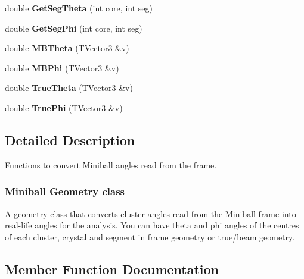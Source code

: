 \begin{DoxyCompactItemize}
double {\bfseries Get\+Seg\+Theta} (int core, int seg)
\item 
\mbox{\label{class_m_b_geometry_a575ddd6022d2d686a83ebce3195b6c50}} 
double {\bfseries Get\+Seg\+Phi} (int core, int seg)
\item 
\mbox{\label{class_m_b_geometry_af4adfb858000405b21f79a6bf10c3c37}} 
double {\bfseries M\+B\+Theta} (T\+Vector3 \&v)
\item 
\mbox{\label{class_m_b_geometry_a399568d67bb83801ef6a2dbe963a535e}} 
double {\bfseries M\+B\+Phi} (T\+Vector3 \&v)
\item 
\mbox{\label{class_m_b_geometry_afd393f9db7182de7fb19f0c934edb383}} 
double {\bfseries True\+Theta} (T\+Vector3 \&v)
\item 
\mbox{\label{class_m_b_geometry_a718d9c7fcc4a5fb8b9ecaabdc7a0503f}} 
double {\bfseries True\+Phi} (T\+Vector3 \&v)
\end{DoxyCompactItemize}


\subsection{Detailed Description}
Functions to convert Miniball angles read from the frame. 



 \subsubsection*{Miniball Geometry class }

A geometry class that converts cluster angles read from the Miniball frame into real-\/life angles for the analysis. You can have theta and phi angles of the centres of each cluster, crystal and segment in frame geometry or true/beam geometry. 

\subsection{Member Function Documentation}
\mbox{\label{class_m_b_geometry_a39f685610ae0e68e547a46f8ef992599}} 
